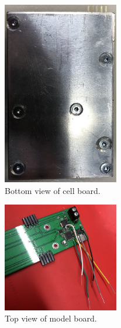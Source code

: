\begin{figure}[ht!]
    \centering
    \includegraphics[width=0.45\textwidth]{CellBoardBottom.jpg}
    \caption{Bottom view of cell board.}
    \label{fig:CellBoardBottom}
\end{figure}

\begin{figure}[ht!]
    \centering
    \includegraphics[width=0.45\textwidth]{ModelBoardTop.jpg}
    \caption{Top view of model board.}
    \label{fig:ModelBoardTop}
\end{figure}
\FloatBarrier